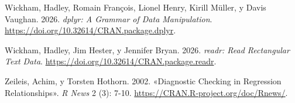 \documentclass[
  spanish,
  a4paper,
]{scrbook}
\newlength{\cslhangindent}
\newenvironment{CSLReferences}[2] %
 {\begin{list}{}{%
  \setlength{\itemindent}{0pt}
  \setlength{\leftmargin}{0pt}
  \setlength{\parsep}{0pt}
  \ifodd #1
   \setlength{\leftmargin}{\cslhangindent}
   \setlength{\itemindent}{-1\cslhangindent}
  \fi
  \setlength{\itemsep}{#2\baselineskip}}}
 {\end{list}}
\begin{document}
\begin{CSLReferences}{1}{1}
Wickham, Hadley, Romain François, Lionel Henry, Kirill Müller, y Davis
Vaughan. 2026. \emph{dplyr: A Grammar of Data Manipulation}.
\url{https://doi.org/10.32614/CRAN.package.dplyr}.

Wickham, Hadley, Jim Hester, y Jennifer Bryan. 2026. \emph{readr: Read
Rectangular Text Data}.
\url{https://doi.org/10.32614/CRAN.package.readr}.

Zeileis, Achim, y Torsten Hothorn. 2002. {«Diagnostic Checking in
Regression Relationships»}. \emph{R News} 2 (3): 7-10.
\url{https://CRAN.R-project.org/doc/Rnews/}.

\end{CSLReferences}


\backmatter
\end{document}
